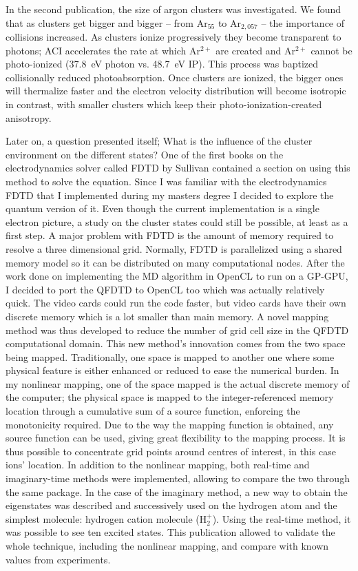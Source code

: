 In the second publication, the size of argon clusters was investigated. We found
that as clusters get bigger and bigger -- from Ar$_{55}$ to Ar$_{2,057}$ --
the importance of collisions increased. As clusters ionize progressively they
become transparent to photons; ACI accelerates the rate at which Ar$^{2+}$ are
created and Ar$^{2+}$ cannot be photo-ionized (37.8~eV photon vs. 48.7~eV IP).
This process was baptized collisionally reduced photoabsorption. Once clusters
are ionized, the bigger ones will thermalize faster and the electron velocity
distribution will become isotropic in contrast, with smaller clusters which
keep their photo-ionization-created anisotropy.


Later on, a question presented itself; What is the influence of the cluster
environment on the different states? One of the first books on the
electrodynamics solver called FDTD by Sullivan contained a section on using
this method to solve the \schrodinger equation. Since I was familiar with
the electrodynamics FDTD that I implemented during my masters degree I decided
to explore the quantum version of it. Even though the current implementation is
a single electron picture, a study on the cluster states could still be possible,
at least as a first step. A major problem with FDTD is the amount of memory
required to resolve a three dimensional grid. Normally, FDTD is parallelized
using a shared memory model so it can be distributed on many
computational nodes. After the work done on implementing the MD algorithm in
OpenCL to run on a GP-GPU, I decided to port the QFDTD to OpenCL too
which was actually relatively quick. The video cards could run the code faster,
but video cards have their own discrete memory which is a lot smaller than main
memory. A novel mapping method was thus developed to reduce the number of grid
cell size in the QFDTD computational domain. This new method's innovation comes
from the two space being mapped. Traditionally, one space is mapped to another
one where some physical feature is either enhanced or reduced to ease the numerical
burden. In my nonlinear mapping, one of the space mapped is the actual
discrete memory of the computer; the physical space is mapped to the
integer-referenced memory location through a cumulative sum of a source function,
enforcing the monotonicity required. Due to the way the mapping function is
obtained, any source function can be used, giving great flexibility to the
mapping process. It is thus possible to concentrate grid points around centres
of interest, in this case ions' location. In addition to the nonlinear mapping,
both real-time and imaginary-time methods were implemented, allowing to compare
the two through the same package. In the case of the imaginary method, a new
way to obtain the eigenstates was described and successively used on the
hydrogen atom and the simplest molecule: hydrogen cation molecule (H$_{2}^{+}$).
Using the real-time method, it was possible to see ten excited states. This
publication allowed to validate the whole technique, including the nonlinear
mapping, and compare with known values from experiments.

